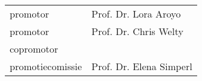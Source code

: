 \thispagestyle{empty}

\begin{addmargin}[-3cm]{1cm}

\begin{flushleft}
\begin{tabular}{l l}
promotor & Prof. Dr. Lora Aroyo\\
promotor & Prof. Dr. Chris Welty\\
copromotor & \\
promotiecomissie & Prof. Dr. Elena Simperl\\
\end{tabular}
\end{flushleft}

\end{addmargin}